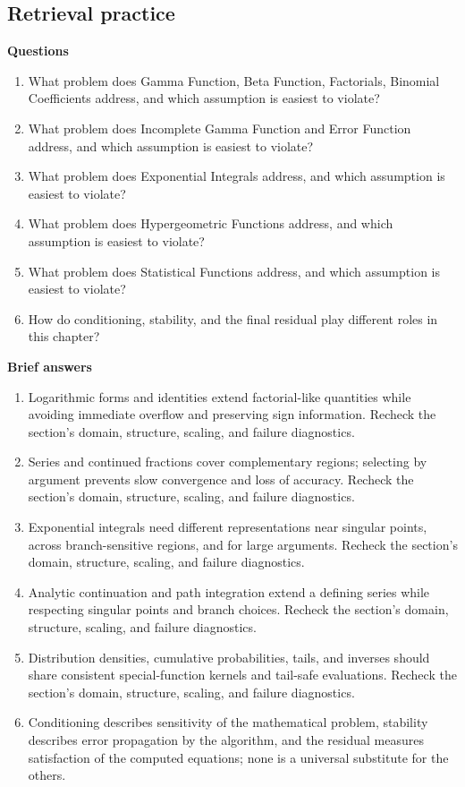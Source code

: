 \documentclass[10pt,letterpaper]{article}
\begin{document}
\subsection*{Retrieval practice}
\textbf{Questions}
\begin{enumerate}
\item What problem does Gamma Function, Beta Function, Factorials, Binomial Coefficients address, and which assumption is easiest to violate?
\item What problem does Incomplete Gamma Function and Error Function address, and which assumption is easiest to violate?
\item What problem does Exponential Integrals address, and which assumption is easiest to violate?
\item What problem does Hypergeometric Functions address, and which assumption is easiest to violate?
\item What problem does Statistical Functions address, and which assumption is easiest to violate?
\item How do conditioning, stability, and the final residual play different roles in this chapter?
\end{enumerate}

\textbf{Brief answers}
\begin{enumerate}
\item Logarithmic forms and identities extend factorial-like quantities while avoiding immediate overflow and preserving sign information. Recheck the section's domain, structure, scaling, and failure diagnostics.
\item Series and continued fractions cover complementary regions; selecting by argument prevents slow convergence and loss of accuracy. Recheck the section's domain, structure, scaling, and failure diagnostics.
\item Exponential integrals need different representations near singular points, across branch-sensitive regions, and for large arguments. Recheck the section's domain, structure, scaling, and failure diagnostics.
\item Analytic continuation and path integration extend a defining series while respecting singular points and branch choices. Recheck the section's domain, structure, scaling, and failure diagnostics.
\item Distribution densities, cumulative probabilities, tails, and inverses should share consistent special-function kernels and tail-safe evaluations. Recheck the section's domain, structure, scaling, and failure diagnostics.
\item Conditioning describes sensitivity of the mathematical problem, stability describes error propagation by the algorithm, and the residual measures satisfaction of the computed equations; none is a universal substitute for the others.
\end{enumerate}
\end{document}
